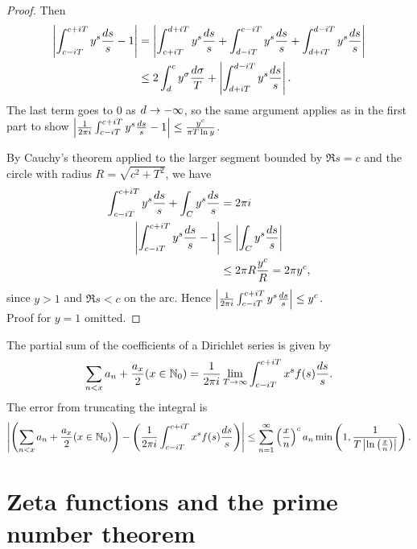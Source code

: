 \begin{proof}

Then 
\begin{align*}
\left| {\int_{c-iT}^{c+iT}y^s\frac{ds}{s}-1} \right|
&=\left| {\int_{c+iT}^{d+iT} y^s\frac{ds}{s}+\int_{d-iT}^{c-iT} y^s\frac{ds}{s}+\int_{d+iT}^{d-iT} y^s\frac{ds}{s}} \right|\\
&\le 2\int_d^c y^{\sigma}\frac{d\sigma}{T}+\left| {\int_{d+iT}^{d-iT} y^s\frac{ds}{s}} \right|.
\end{align*}
The last term goes to 0 as $d\to -\infty$, so the same argument applies as in the first part to show $\left| {\frac{1}{2\pi i} \int_{c-iT}^{c+iT}y^s\frac{ds}{s}-1} \right|\le \frac{y^c}{\pi T\ln y}$.

By Cauchy's theorem applied to the larger segment bounded by $\Re s=c$ and the circle with radius $R=\sqrt{c^2+T^2}$,  we have
\begin{align*}
\int_{c-iT}^{c+iT} y^s\frac{ds}{s}+\int_C y^s\frac{ds}{s}&=2\pi i\\
\left| {\int_{c-iT}^{c+iT} y^s\frac{ds}{s}-1} \right|
&\le \left| {\int_C y^s\frac{ds}{s}} \right|\\
&\le 2\pi R\frac{y^{c}}{R}=2\pi y^c,
\end{align*}
since $y>1$ and $\Re s<c$ on the arc. Hence $\left| {\frac{1}{2\pi i}\int_{c-iT}^{c+iT} y^s\frac{ds}{s}} \right|\le y^c$.\\

Proof for $y=1$ omitted.
\end{proof}
\begin{cor}
The partial sum of the coefficients of a Dirichlet series is given by 
\[
\sum_{n<x} a_n+\frac{a_x}{2}(x\in \mathbb{N}_0)=\frac{1}{2\pi i} \lim_{T\to \infty}\int_{c-iT}^{c+iT} x^s f(s)\frac{ds}{s}.
\]
The error from truncating the integral is
\[
\left| {\left( {\sum_{n<x} a_n+\frac{a_x}{2}(x\in \mathbb{N}_0)} \right)-\left( {\frac{1}{2\pi i} \int_{c-iT}^{c+iT} x^s f(s)\frac{ds}{s}} \right)} \right|\le \sum_{n=1}^{\infty} \left( {\frac{x}{n}} \right)^c a_n\min\left( {1,\frac{1}{T\left| {\ln\left( {\frac{x}{n}} \right)} \right|}} \right).
\]
\end{cor}


\chapter{Zeta functions and the prime number theorem}
